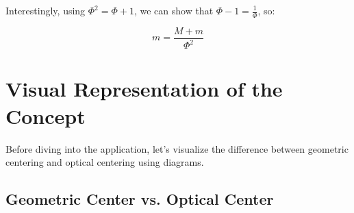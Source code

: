 \documentclass[12pt,a4paper]{article}
\begin{document}
Interestingly, using $\Phi^2 = \Phi + 1$, we can show that $\Phi - 1 = \frac{1}{\Phi}$, so:

\begin{equation}
  m = \frac{M + m}{\Phi^2}
\end{equation}

\section{Visual Representation of the Concept}

Before diving into the application, let's visualize the difference between geometric centering and optical centering using diagrams.

\subsection{Geometric Center vs. Optical Center}
\end{document}
